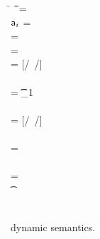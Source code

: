 \documentclass[a4paper,USenglish]{tex/lipics-v2016}
\begin{document}
\begin{figure}[!h]
\noindent\hrulefill

\medskip\small

\begin{minipage}{\textwidth}
\small        
\begin{tabbing}
  \K\HS \New{} \HS\= \s~ \HS \=\Red\HS \= \K \HS\= \ap \HS\= \sp\HS \= \WHERE\HS\= \fresh\ap \HS\HS\HS\HS\HS\HS\HS\=  \sp = {\Map{}}
\\
\K\HS \FReadR\a{\f[i]} \> \s           \>\Red\>     \K \>$\a[i]$ \> \s  \> \WHERE \>\App\s\a=\obj\C{\a[1],\ldots\a[i],\a[n]\ldots}
\\
\K\HS {\FWriteR\a{\f[i]}\ap} \> \s     \>\Red\>     \K \> \ap \> \sp \>  \WHERE \>\App\s\a=\obj\C{\a[1],\ldots\a[i],\a[n]\ldots} \HS  
\\ \> \> \> \> \> \> \> \sp = \Map\s{\Bind\a{\obj\C{\a[1],\ldots\ap,\a[n]\ldots}}}
\\
\K\HS{\KCall\a\m\ap\t\tp} \> \s      \>\Red\>     \K \>  \ep \> \s \> \WHERE\> \ep = {[\a/\this~{\ap/\x}]\e} \HS \\ \> \> \> \> \> \> \> \Mdef\m{}\e\In \App\K\C  \\ \> \> \> \> \> \> \>  \App\s\a=\obj{} \> \StrSub {\emptyset}\K\t {\t_{1}} \\ 
\> \> \> \> \> \> \> \StrSub {\emptyset} \tp
\\
 \K\HS {\DynCall\a\m\ap}\> \s        \>\Red\>    \K \> \ep \> \s \>  \WHERE\> \ep = {[\a/\this~{\ap/\x}]\e}\HS \\ \> \> \> \> \> \> \> \Mdef\m\x\any\any\e \In \App\K\C \\ \> \> \> \> \> \> \> \App\s\a=\obj{} 
\\
 \K\HS {\SubCast \any\a} \> \s       \>\Red\>   \K \> \a \> \s
\\
 \K\HS {\SubCast \D\a} \> \s        \>\Red\>    \K \> \a \> \s \>  \WHERE\> \StrSub {\emptyset}\K\C \D \>\App\s\a=\obj{} 
\\
 \K\HS {\BehCast \t\a} \> \s         \>\Red\>   \Kp \> \ap \> \sp \> \WHERE\> \behcast \a\t\s\K \Kp\ap\sp    
\\
\K \HS \EM{\EE[\e]} \> \s            \>\Red\>   \Kp \> \EM{\EE[\ep]} \> \sp \> \WHERE \> \K~\e~\s \Red~\Kp~\ep~\sp
\end{tabbing}
\end{minipage}

\medskip
\hrulefill
\caption{\kafka dynamic semantics.}\label{fig:semantics}
\end{figure}
\end{document}
